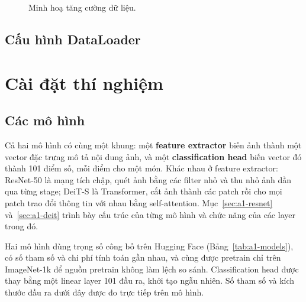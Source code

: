 \documentclass[a4paper,12pt]{article}
\begin{document}
\begin{figure}[!htbp]
    \centering
    \caption{Minh hoạ tăng cường dữ liệu.}\label{fig:a1-aug}
\end{figure}

\FloatBarrier

\subsection{Cấu hình DataLoader}

\section{Cài đặt thí nghiệm}\label{sec:a1-setup}
\subsection{Các mô hình}\label{sec:a1-models}
Cả hai mô hình có cùng một khung: một \textbf{feature extractor} biến ảnh thành một vector đặc trưng mô tả nội dung ảnh, và một \textbf{classification head} biến vector đó thành 101 điểm số, mỗi điểm cho một món. Khác nhau ở feature extractor: ResNet-50 là mạng tích chập, quét ảnh bằng các filter nhỏ và thu nhỏ ảnh dần qua từng stage; DeiT-S là Transformer, cắt ảnh thành các patch rồi cho mọi patch trao đổi thông tin với nhau bằng self-attention. Mục~\ref{sec:a1-resnet} và~\ref{sec:a1-deit} trình bày cấu trúc của từng mô hình và chức năng của các layer trong đó.

Hai mô hình dùng trọng số công bố trên Hugging Face (Bảng~\ref{tab:a1-models}), có số tham số và chi phí tính toán gần nhau, và cùng được pretrain chỉ trên ImageNet-1k để nguồn pretrain không làm lệch so sánh. Classification head được thay bằng một linear layer 101 đầu ra, khởi tạo ngẫu nhiên. Số tham số và kích thước đầu ra dưới đây được đo trực tiếp trên mô hình.
\end{document}

